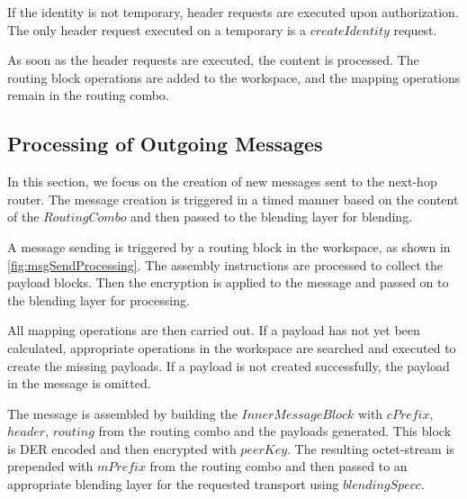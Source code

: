 If the identity is not temporary, header requests are executed upon authorization. The only header request executed on a temporary  is a $createIdentity$ request. 

\begin{figure*}[ht]\centering
	\resizebox{0.95\textwidth}{!}{}
	\caption{Flow diagram showing processing of outgoing messages}
	\label{fig:msgReceiveProcessing}
\end{figure*}

As soon as the header requests are executed, the content is processed. The routing block operations are added to the workspace, and the mapping operations remain in the routing combo. 

\subsection{Processing of Outgoing Messages}\label{sec:processingOutgoingMessages}
In this section, we focus on the creation of new messages sent to the next-hop router. The message creation is triggered in a timed manner based on the content of the $RoutingCombo$ and then passed to the blending layer for blending.

A message sending is triggered by a routing block in the workspace, as shown in \cref{fig:msgSendProcessing}. The assembly instructions are processed to collect the payload blocks. Then the encryption is applied to the message and passed on to the blending layer for processing.

\begin{figure*}[ht]\centering
	\resizebox{0.95\textwidth}{!}{}
	\caption{Flow diagram showing processing of outgoing messages}
	\label{fig:msgSendProcessing}
\end{figure*}

All mapping operations are then carried out. If a payload has not yet been calculated, appropriate operations in the workspace are searched and executed to create the missing payloads. If a payload is not created successfully, the payload in the message is omitted. 

The message is assembled by building the $InnerMessageBlock$ with $cPrefix$, $header$, $routing$ from the routing combo and the payloads generated. This block is DER encoded and then encrypted with $peerKey$. The resulting octet-stream is prepended with $mPrefix$ from the routing combo and then passed to an appropriate blending layer for the requested transport using $blendingSpecc$.

